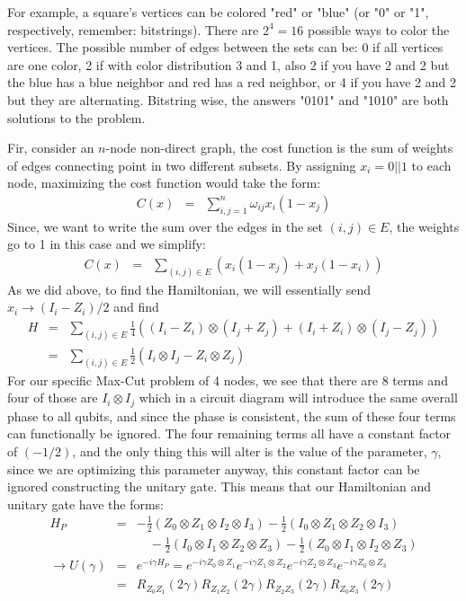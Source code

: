 \documentclass[preprint,aps,prd,nofootinbib,superscriptaddress]{revtex4-2}
\begin{document}
%
For example, a square's vertices can be colored "red" or "blue" (or "0" or "1", respectively, remember: bitstrings). There are $2^4 = 16$ possible ways to color the vertices. The possible number of edges between the sets can be: 0 if all vertices are one color, 2 if with color distribution 3 and 1, also 2 if you have 2 and 2 but the blue has a blue neighbor and red has a red neighbor, or 4 if you have 2 and 2 but they are alternating. Bitstring wise, the answers "0101" and "1010" are both solutions to the problem.
%

%
Fir, consider an $n$-node non-direct graph, the cost function is the sum of weights of edges connecting point in two different subsets. By assigning $x_i = 0 || 1$ to each node, maximizing the cost function would take the form:
%
\begin{eqnarray}
C(x) &=& \sum \limits _{i,j=1} ^n \omega_{ij} x_i (1-x_j) 
\end{eqnarray}
%
Since, we want to write the sum over the edges in the set $(i,j)\in E$, the weights go to 1 in this case and we simplify:
%
\begin{eqnarray}
C(x) &=& \sum \limits _{(i,j)\in E} (x_i (1-x_j) +  x_j (1-x_i))
\end{eqnarray}
%
As we did above, to find the Hamiltonian, we will essentially send $x_i \rightarrow (I_i-Z_i)/2$ and find
%
\begin{eqnarray}
H &=& \sum \limits _{(i,j)\in E} \frac{1}{4}((I_i - Z_i)\otimes (I_j + Z_j) + (I_i + Z_i) \otimes (I_j - Z_j))
\nonumber \\
&=& \sum \limits _{(i,j)\in E} \frac{1}{2}(I_i \otimes I_j - Z_i \otimes Z_j)
\end{eqnarray}
%
For our specific Max-Cut problem of 4 nodes, we see that there are 8 terms and four of those are $I_i \otimes I_j$ which in a circuit diagram will introduce the same overall phase to all qubits, and since the phase is consistent, the sum of these four terms can functionally be ignored. The four remaining terms all have a constant factor of $(-1/2)$, and the only thing this will alter is the value of the parameter, $\gamma$, since we are optimizing this parameter anyway, this constant factor can be ignored constructing the unitary gate. This means that our Hamiltonian and unitary gate have the forms:
%
\begin{eqnarray}
H_P &=& 
-\frac{1}{2}(Z_0 \otimes Z_1 \otimes I_2 \otimes I_3) 
- \frac{1}{2}(I_0 \otimes Z_1 \otimes Z_2 \otimes I_3)
\nonumber \\
&& \quad 
- \frac{1}{2}(I_0 \otimes I_1 \otimes Z_2 \otimes Z_3)
- \frac{1}{2}(Z_0 \otimes I_1 \otimes I_2 \otimes Z_3)
\nonumber \\
\rightarrow U(\gamma) &=&
e^{-i \gamma H_P} = e^{-i \gamma Z_0 \otimes Z_1}e^{-i \gamma Z_1 \otimes Z_2}e^{-i \gamma Z_2 \otimes Z_3}e^{-i \gamma Z_0 \otimes Z_3}
\nonumber \\
&=& R_{Z_0 Z_1}(2 \gamma) R_{Z_1 Z_2}(2 \gamma) R_{Z_2 Z_3}(2 \gamma) R_{Z_0 Z_3}(2 \gamma)
\end{eqnarray}
\end{document}
